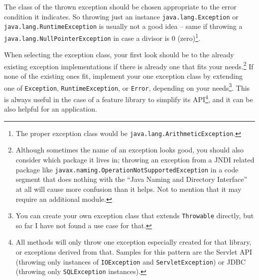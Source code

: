 \documentclass[11pt,a4paper, titlepage, parskip=half, headsepline, footsepline, cleardoublepage=current, headheight=1cm]{scrbook}
\begin{document}
The class of the thrown exception should be chosen appropriate to the error condition it indicates. So throwing just an instance  \lstinline|java.lang.Exception| or \lstinline|java.lang.RuntimeException| is usually not a good idea – same if throwing a \lstinline|java.lang.NullPointerException|\autocite{ORACLE_DOC_NULLPOINTEREXCEPTION_CLASS} in case a divisor is 0 (zero)\footnote{The proper exception class would be \lstinline|java.lang.ArithmeticException|\autocite{ORACLE_DOC_ARITHMETICEXCEPTION_CLASS}.}.

When selecting the exception class, your first look should be to the already existing exception implementations if there is already one that fits your needs.\footnote{Although sometimes the name of an exception looks good, you should also consider which package it lives in; throwing an exception from a JNDI related package like \lstinline|javax.naming.OperationNotSupportedException| in a code segment that does nothing with the “Java Naming and Directory Interface” at all will cause more confusion than it helps. Not to mention that it may require an additional module.} If none of the existing ones fit, implement your one exception class by extending one of \lstinline|Exception|, \lstinline|RuntimeException|, or \lstinline|Error|, depending on your needs\footnote{You can create your own exception class that extends \lstinline|Throwable| directly, but so far I have not found a use case for that.}. This is always useful in the case of a feature library to simplify its API\footnote{All methods will only throw one exception especially created for that library, or exceptions derived from that. Samples for this pattern are the Servlet API (throwing only instances of \lstinline|IOException| and \lstinline|ServletException|) or JDBC (throwing only \lstinline|SQLException| instances).}, and it can be also helpful for an application.
\end{document}
